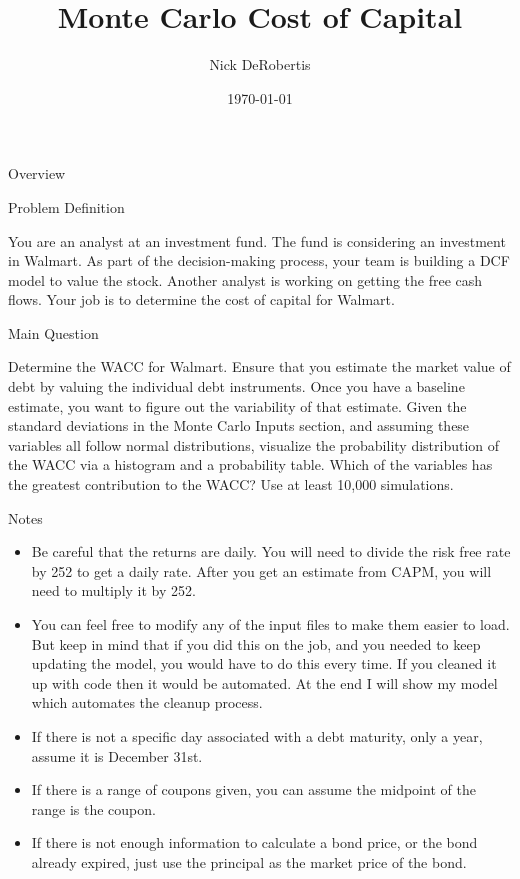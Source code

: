\documentclass[]{article}
\begin{document}
\title{Monte Carlo Cost of Capital}
\author{Nick DeRobertis}
\date{\today}
\maketitle
\begin{section}{Overview}
\begin{subsection}{Problem Definition}


You are an analyst at an investment fund. The fund is considering an investment in Walmart. As part of the
decision-making process, your team is building a DCF model to value the stock. Another analyst is working on
getting the free cash flows. Your job is to determine the cost of capital for Walmart.


\end{subsection}

\begin{subsection}{Main Question}


Determine the WACC for Walmart. Ensure that you estimate the market value of debt by valuing the individual
debt instruments.
Once you have a baseline estimate, you want to figure out the variability of that
estimate. Given the standard deviations in the Monte Carlo Inputs section,
and assuming these variables all follow normal distributions,
visualize the probability distribution of the WACC via a histogram and a probability table. Which of the variables
has the greatest contribution to the WACC? Use at least 10,000 simulations.


\end{subsection}



\begin{subsection}{Notes}


\begin{itemize}
\item Be careful that the returns are daily. You will need to divide the risk free rate by 252 to get a daily rate. After you get an estimate from CAPM, you will need to multiply it by 252.
\item You can feel free to modify any of the input files to make them easier to load. But keep in mind that if you did this on the job, and you needed to keep updating the model, you would have to do this every time. If you cleaned it up with code then it would be automated. At the end I will show my model which automates the cleanup process.
\item If there is not a specific day associated with a debt maturity, only a year, assume it is December 31st.
\item If there is a range of coupons given, you can assume the midpoint of the range is the coupon.
\item If there is not enough information to calculate a bond price, or the bond already expired, just use the principal as the market price of the bond.
\end{itemize}



\end{subsection}
\end{section}
\end{document}
